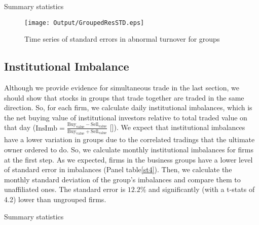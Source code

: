 {			\begin{table}[htbp]
\caption{Summary statistics}
\label{st3}
	\centering
	\label{tab:ResidualTrunSummary}
	\resizebox{\textwidth}{!}{
		
	}
	\bigskip
			\centering
			\label{tab:ResidualTrunStdSummary}
			\resizebox{\textwidth}{!}{
				
			}
		\end{table}
		
		
\begin{figure}[htbp]
	\centering
	\texttt{[image: Output/GroupedResSTD.eps]}

	\caption{Time series of standard errors in abnormal turnover for groups}
	\label{fig:GroupedResSTD}
\end{figure}






\FloatBarrier

%
%
\subsection{{Institutional Imbalance}}

Although we provide evidence for simultaneous trade in the last section, we should show that stocks in groups that trade together are traded in the same direction. So, for each firm, we calculate daily institutional imbalances, which is the net buying value of institutional investors relative to total traded value on that day ($ \text{InsImb} = \frac{\text{Buy}_{\text{value}} - \text{Sell}_{\text{value}}}{\text{Buy}_{\text{value}} + \text{Sell}_{\text{value}}} $ [\cite{seasholes2007predictable}]). We expect that institutional imbalances have a lower variation in groups due to the correlated tradings that the ultimate owner ordered to do. So, we calculate monthly institutional imbalances for firms at the first step. As we expected, firms in the business groups have a lower level of standard error in imbalances (Panel  table\ref{st4}). Then, we calculate the monthly standard deviation of the group's imbalances and compare them to unaffiliated ones. The standard error is  $12.2\%$ and significantly (with a t-stats of 4.2) lower than ungrouped firms. 
		
	{\begin{table}[htbp]
	\caption{Summary statistics}
	\label{st4}
		\centering
			\label{tab:ImbalanceInsMeanSummary}%
		\resizebox{\textwidth}{!}{
			
		}
	

\end{table}}}
